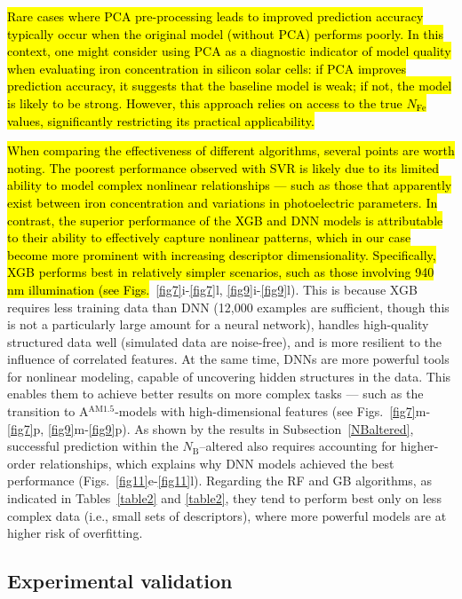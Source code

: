 \documentclass[a4paper,fleqn,draft]{cas-sc}
\begin{document}
\textcolor[rgb]{1.00,0.07,0.00}{
\hl{
Rare cases where PCA pre-processing leads to improved prediction accuracy typically
occur when the original model (without PCA) performs poorly.
In this context, one might consider using PCA as a diagnostic indicator of model quality
when evaluating iron concentration in silicon solar cells:
if PCA improves prediction accuracy, it suggests that the baseline model is weak;
if not, the model is likely to be strong.
However, this approach relies on access to the true $N_\mathrm{Fe}$ values,
significantly restricting its practical applicability.
}}

\textcolor[rgb]{1.00,0.07,0.00}{
\hl{
When comparing the effectiveness of different algorithms, several points are worth noting.
The poorest performance observed with SVR is likely due to its limited ability
to model complex nonlinear relationships ---
such as those that apparently exist between iron concentration and variations in photoelectric parameters.
In contrast, the superior performance of the XGB and DNN models is attributable to
their ability to effectively capture nonlinear patterns, which in our case become more prominent with increasing descriptor dimensionality.
Specifically, XGB performs best in relatively simpler scenarios, such as those involving 940 nm illumination
(see Figs.}~\ref{fig7}i-\ref{fig7}l, \ref{fig9}i-\ref{fig9}l).
This is because XGB requires less training data than DNN
(12,000 examples are sufficient, though this is not a particularly large amount for a neural network),
handles high-quality structured data well (simulated data are noise-free),
and is more resilient to the influence of correlated features.
At the same time, DNNs are more powerful tools for nonlinear modeling,
capable of uncovering hidden structures in the data.
This enables them to achieve better results on more complex tasks ---
such as the transition to A$^\mathrm{AM1.5}$-models with high-dimensional features
(see Figs.~\ref{fig7}m-\ref{fig7}p, \ref{fig9}m-\ref{fig9}p).
As shown by the results in Subsection~\ref{NBaltered}, successful prediction within the
$N_\mathrm{B}$--altered also requires accounting for higher-order relationships,
which explains why DNN models achieved the best performance (Figs.~\ref{fig11}e-\ref{fig11}l).
Regarding the RF and GB algorithms, as indicated in Tables~\ref{table2} and \ref{table2},
they tend to perform best only on less complex data
(i.e., small sets of descriptors), where more powerful models are at higher risk of overfitting.
}


\subsection{Experimental validation}
\end{document}
